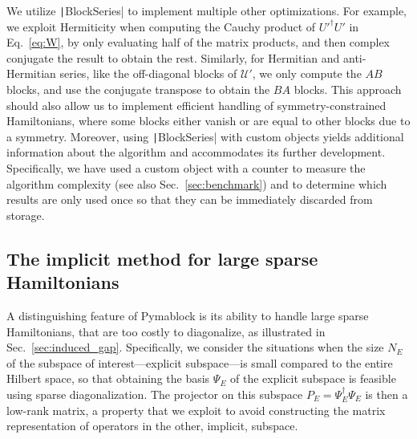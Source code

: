 We utilize \texttt|BlockSeries| to implement multiple other optimizations.
For example, we exploit Hermiticity when computing the Cauchy product of $U'^{\dagger}U'$ in Eq.~\eqref{eq:W}, by only evaluating half of the matrix products, and then complex conjugate the result to obtain the rest.
Similarly, for Hermitian and anti-Hermitian series, like the off-diagonal blocks of $\mathcal{U}'$, we only compute the $AB$ blocks, and use the conjugate transpose to obtain the $BA$ blocks.
This approach should also allow us to implement efficient handling of symmetry-constrained Hamiltonians, where some blocks either vanish or are equal to other blocks due to a symmetry.
Moreover, using \texttt|BlockSeries| with custom objects yields additional information about the algorithm and accommodates its further development.
Specifically, we have used a custom object with a counter to measure the algorithm complexity (see also Sec.~\ref{sec:benchmark}) and to determine which results are only used once so that they can be immediately discarded from storage.

\subsection{The implicit method for large sparse Hamiltonians}
\label{sec:implicit}

A distinguishing feature of Pymablock is its ability to handle large sparse Hamiltonians, that are too costly to diagonalize, as illustrated in Sec.~\ref{sec:induced_gap}.
Specifically, we consider the situations when the size $N_E$ of the subspace of interest---explicit subspace---is small compared to the entire Hilbert space, so that obtaining the basis $\Psi_E$ of the explicit subspace is feasible using sparse diagonalization.
The projector on this subspace $P_E = \Psi_E^\dagger \Psi_E$ is then a low-rank matrix, a property that we exploit to avoid constructing the matrix representation of operators in the other, implicit, subspace.

